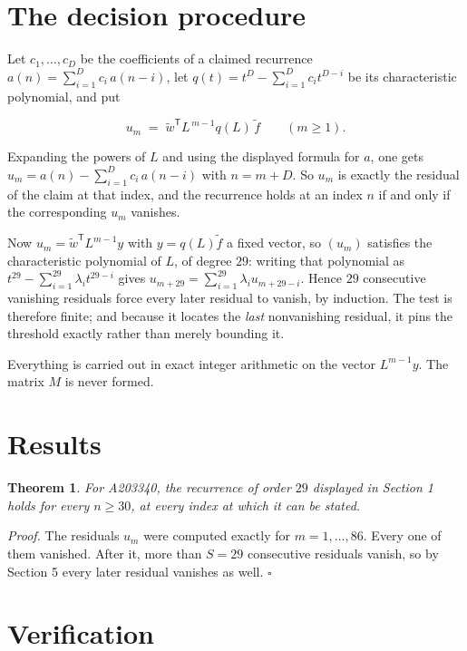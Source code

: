 \documentclass[11pt]{article}
\newtheorem{theorem}{Theorem}
\theoremstyle{definition}
\begin{document}
\section{The decision procedure}

Let $c_1,\dots,c_D$ be the coefficients of a claimed recurrence $a(n) = \sum_{i=1}^{D} c_i\,a(n-i)$, let $q(t) = t^{D} - \sum_{i=1}^{D} c_i t^{D-i}$ be its characteristic polynomial, and put

\[u_m \;=\; \tilde w^{\mathsf T} L^{\,m-1} q(L)\,\tilde f \qquad (m \ge 1).\]

Expanding the powers of $L$ and using the displayed formula for $a$, one gets $u_m = a(n) - \sum_{i=1}^{D} c_i\,a(n-i)$ with $n = m + D$. So $u_m$ is exactly the residual of the claim at that index, and the recurrence holds at an index $n$ if and only if the corresponding $u_m$ vanishes.

Now $u_m = \tilde w^{\mathsf T} L^{m-1} y$ with $y = q(L)\tilde f$ a fixed vector, so $(u_m)$ satisfies the characteristic polynomial of $L$, of degree $29$: writing that polynomial as $t^{29} - \sum_{i=1}^{29} \lambda_i t^{29-i}$ gives $u_{m+29} = \sum_{i=1}^{29} \lambda_i u_{m+29-i}$. Hence $29$ consecutive vanishing residuals force every later residual to vanish, by induction. The test is therefore finite; and because it locates the {\itshape last} nonvanishing residual, it pins the threshold exactly rather than merely bounding it.

Everything is carried out in exact integer arithmetic on the vector $L^{m-1}y$. The matrix $M$ is never formed.

\section{Results}

\begin{theorem} For A203340, the recurrence of order $29$ displayed in Section 1 holds for every $n \ge 30$, at every index at which it can be stated.\end{theorem}

{\itshape Proof.} The residuals $u_m$ were computed exactly for $m = 1,\dots,86$. Every one of them vanished. After it, more than $S = 29$ consecutive residuals vanish, so by Section 5 every later residual vanishes as well. $\square$

\section{Verification}
\end{document}
